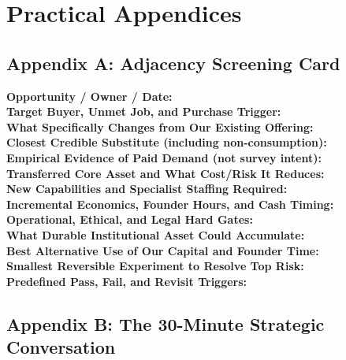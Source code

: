 \section*{Practical Appendices}
\label{sec:practical_appendices_adjacencies}

\subsection*{Appendix A: Adjacency Screening Card}
\label{sec:appendix_a_adjacency_screening_card}

\begin{tcolorbox}[colback=white,colframe=black!75,arc=1mm,title=\textbf{Adjacency Screening Card: Initial Feasibility Filter}]
\small
\noindent\textbf{Opportunity / Owner / Date:} \\
\textbf{Target Buyer, Unmet Job, and Purchase Trigger:} \\
\textbf{What Specifically Changes from Our Existing Offering:} \\
\textbf{Closest Credible Substitute (including non-consumption):} \\
\textbf{Empirical Evidence of Paid Demand (not survey intent):} \\
\textbf{Transferred Core Asset and What Cost/Risk It Reduces:} \\
\textbf{New Capabilities and Specialist Staffing Required:} \\
\textbf{Incremental Economics, Founder Hours, and Cash Timing:} \\
\textbf{Operational, Ethical, and Legal Hard Gates:} \\
\textbf{What Durable Institutional Asset Could Accumulate:} \\
\textbf{Best Alternative Use of Our Capital and Founder Time:} \\
\textbf{Smallest Reversible Experiment to Resolve Top Risk:} \\
\textbf{Predefined Pass, Fail, and Revisit Triggers:}
\end{tcolorbox}

\subsection*{Appendix B: The 30-Minute Strategic Conversation}
\label{sec:appendix_b_thirty_minute_conversation}

